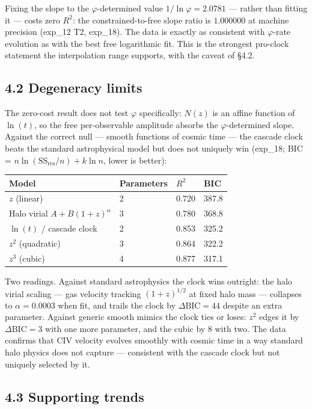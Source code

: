 \documentclass[11pt,a4paper]{article}
\begin{document}
Fixing the slope to the $\varphi$-determined value $1/\ln\varphi = 2.0781$ — rather than fitting it — costs zero $R^2$: the constrained-to-free slope ratio is $1.000000$ at machine precision (exp\_12 T2, exp\_18). The data is exactly as consistent with $\varphi$-rate evolution as with the best free logarithmic fit. This is the strongest pro-clock statement the interpolation range supports, with the caveat of §4.2.

\subsection*{4.2 Degeneracy limits}

The zero-cost result does not test $\varphi$ specifically: $N(z)$ is an affine function of $\ln(t)$, so the free per-observable amplitude absorbs the $\varphi$-determined slope. Against the correct null — smooth functions of cosmic time — the cascade clock beats the standard astrophysical model but does not uniquely win (exp\_18; BIC = $n\ln(\text{SS}_\text{res}/n) + k\ln n$, lower is better):

\begin{longtable}[]{@{}llll@{}}
\toprule
Model & Parameters & $R^2$ & BIC \\
\midrule\endhead
$z$ (linear) & 2 & 0.720 & 387.8 \\
Halo virial $A + B(1+z)^\alpha$ & 3 & 0.780 & 368.8 \\
$\ln(t)$ / cascade clock & 2 & 0.853 & 325.2 \\
$z^2$ (quadratic) & 3 & 0.864 & 322.2 \\
$z^3$ (cubic) & 4 & 0.877 & 317.1 \\
\bottomrule
\end{longtable}

Two readings. Against standard astrophysics the clock wins outright: the halo virial scaling — gas velocity tracking $(1+z)^{1/2}$ at fixed halo mass — collapses to $\alpha = 0.0003$ when fit, and trails the clock by $\Delta\text{BIC} = 44$ despite an extra parameter. Against generic smooth mimics the clock ties or loses: $z^2$ edges it by $\Delta\text{BIC} = 3$ with one more parameter, and the cubic by $8$ with two. The data confirms that CIV velocity evolves smoothly with cosmic time in a way standard halo physics does not capture — consistent with the cascade clock but not uniquely selected by it.

\subsection*{4.3 Supporting trends}
\end{document}

